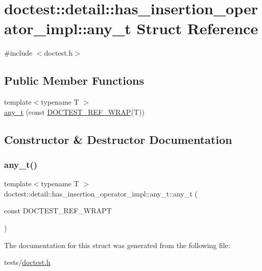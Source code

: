 \hypertarget{structdoctest_1_1detail_1_1has__insertion__operator__impl_1_1any__t}{}\section{doctest\+:\+:detail\+:\+:has\+\_\+insertion\+\_\+operator\+\_\+impl\+:\+:any\+\_\+t Struct Reference}
\label{structdoctest_1_1detail_1_1has__insertion__operator__impl_1_1any__t}


{\ttfamily \#include $<$doctest.\+h$>$}

\subsection*{Public Member Functions}
\begin{DoxyCompactItemize}
\item 
{\footnotesize template$<$typename T $>$ }\\\hyperlink{structdoctest_1_1detail_1_1has__insertion__operator__impl_1_1any__t_a253f4ce5a749ffd79ae9b1c68914e69b}{any\+\_\+t} (const \hyperlink{doctest_8h_af2901cafb023c57fb672ccb1bf14f2eb}{D\+O\+C\+T\+E\+S\+T\+\_\+\+R\+E\+F\+\_\+\+W\+R\+AP}(T))
\end{DoxyCompactItemize}


\subsection{Constructor \& Destructor Documentation}
\mbox{\label{structdoctest_1_1detail_1_1has__insertion__operator__impl_1_1any__t_a253f4ce5a749ffd79ae9b1c68914e69b}} 
\subsubsection{\texorpdfstring{any\+\_\+t()}{any\_t()}}
{\footnotesize\ttfamily template$<$typename T $>$ \\
doctest\+::detail\+::has\+\_\+insertion\+\_\+operator\+\_\+impl\+::any\+\_\+t\+::any\+\_\+t (\begin{DoxyParamCaption}\item[{const }]{D\+O\+C\+T\+E\+S\+T\+\_\+\+R\+E\+F\+\_\+\+W\+R\+APT }\end{DoxyParamCaption})}



The documentation for this struct was generated from the following file\+:\begin{DoxyCompactItemize}
\item 
tests/\hyperlink{doctest_8h}{doctest.\+h}\end{DoxyCompactItemize}

